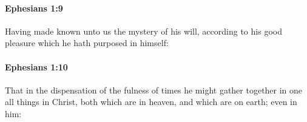 		\paragraph{Ephesians 1:9} %
			\label{EPHESIANS-1-9}

			Having made known unto us the mystery of his will, according to his good pleasure which he hath purposed in himself:

			\begin{framed}
			\scriptsize
				\begin{compactdesc}
					\item[SBLG] 
				\end{compactdesc}
			\end{framed}

		\paragraph{Ephesians 1:10} %
			\label{EPHESIANS-1-10}

			That in the dispensation of the fulness of times he might gather together in one all things in Christ, both which are in heaven, and which are on earth; even in him:

